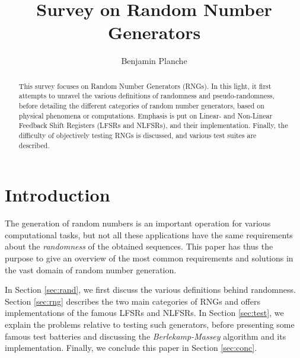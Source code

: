 \documentclass{llncs}
\begin{document}
\title{Survey on Random Number Generators}
%
%
\author{Benjamin Planche}
%
%
%

\maketitle              %

\begin{abstract}
This survey focuses on Random Number Generators (RNGs). In this light, it first attempts to unravel the various definitions of randomness and pseudo-randomness, before detailing the different categories of random number generators, based on physical phenomena or computations. Emphasis is put on Linear- and Non-Linear Feedback Shift Registers (LFSRs and NLFSRs), and their implementation. Finally, the difficulty of objectively testing RNGs is discussed, and various test suites are described.
\end{abstract}
%
\section{Introduction}
%
The generation of random numbers is an important operation for various computational tasks, but not all these applications have the same requirements about the \emph{randomness} of the obtained sequences. This paper has thus the purpose to give an overview of the most common requirements and solutions in the vast domain of random number generation.

In Section \ref{sec:rand}, we first discuss the various definitions behind randomness. Section \ref{sec:rng} describes the two main categories of RNGs and offers implementations of the famous LFSRs and NLFSRs. In Section \ref{sec:test}, we explain the problems relative to testing such generators, before presenting some famous test batteries and discussing the \emph{Berlekamp-Massey} algorithm and its implementation. Finally, we conclude this paper in Section \ref{sec:conc}.
\end{document}
